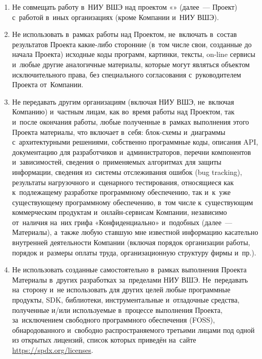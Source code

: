 \documentclass[12pt,a4paper]{extarticle}
\begin{document}
\begin{enumerate}[leftmargin=1.4em, itemsep=5pt]
  \item Не совмещать работу в~НИУ ВШЭ над проектом «\hseProjectName» (далее~---
        Проект) с~работой в~иных организациях (кроме Компании и~НИУ ВШЭ).

  \item Не использовать в~рамках работы над Проектом, не~включать в~состав
        результатов Проекта какие-либо сторонние (в~том числе свои, созданные до
        начала Проекта) исходные коды программ, картинки, тексты, on-line сервисы
        и~любые другие аналогичные материалы, которые могут являться объектом
        исключительного права, без специального согласования с~руководителем
        Проекта от~Компании.

  \item Не передавать другим организациям (включая НИУ ВШЭ, не~включая Компанию)
        и~частным лицам, как во~время работы над Проектом, так и~после окончания
        работы, любые полученные в~рамках выполнения этого Проекта материалы, что
        включает в~себя: блок-схемы и~диаграммы с~архитектурными решениями,
        собственно программные коды, описания API, документацию для разработчиков
        и~администраторов, перечни компонентов и~зависимостей, сведения о~применяемых
        алгоритмах для защиты информации, сведения из~системы отслеживания ошибок
        (bug tracking), результаты нагрузочного и~сценарного тестирования,
        относящиеся как к~подлежащему разработке программному обеспечению, так и~к~уже
        существующему программному обеспечению, в~том числе к~существующим
        коммерческим продуктам и~онлайн-сервисам Компании, независимо от~наличия на~них
        грифа «Конфиденциально» и~подобных (далее~--- Материалы), а~также любую
        ставшую мне известной информацию касательно внутренней деятельности Компании
        (включая порядок организации работы, порядок и~размеры оплаты труда,
        организационную структуру фирмы и~пр.).

  \item Не использовать созданные самостоятельно в~рамках выполнения Проекта
        Материалы в~других разработках за~пределами НИУ ВШЭ. Не~передавать на~сторону
        и~не использовать для других целей любые программные продукты, SDK,
        библиотеки, инструментальные и~отладочные средства, полученные и/или
        используемые в~процессе выполнения Проекта, за~исключением свободного
        программного обеспечения (FOSS), обнародованного и~свободно распространяемого
        третьими лицами под одной из открытых лицензий, список которых приведён
        на~сайте \url{https://spdx.org/licenses}.


\end{enumerate}
\end{document}
